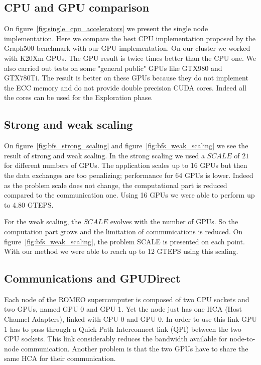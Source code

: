 \subsection{CPU and GPU comparison}

On figure~\ref{fig:single_cpu_accelerators} we present the single node implementation. 
Here we compare the best CPU implementation proposed by the Graph500 benchmark with our GPU implementation. 
On our cluster we worked with K20Xm GPUs. 
The GPU result is twice times better than the CPU one. 
We also carried out tests on some "general public" GPUs like GTX980 and GTX780Ti. 
The result is better on these GPUs because they do not implement the ECC memory and do not provide double precision CUDA cores. 
Indeed all the cores can be used for the Exploration phase. 



\subsection{Strong and weak scaling}

On figure~\ref{fig:bfs_strong_scaling} and figure~\ref{fig:bfs_weak_scaling} we see the result of strong and weak scaling. 
In the strong scaling we used a $SCALE$ of $21$ for different numbers of GPUs. 
The application scales up to 16 GPUs but then the data exchanges are too penalizing;
performance for 64 GPUs is lower. 
Indeed as the problem scale does not change, the computational part is reduced compared to the communication one. 
Using 16 GPUs we were able to perform up to 4.80 GTEPS. 


For the weak scaling, the $SCALE$ evolves with the number of GPUs. 
So the computation part grows and the limitation of communications is reduced. 
On figure~\ref{fig:bfs_weak_scaling}, the problem SCALE is presented on each point. 
With our method we were able to reach up to 12 GTEPS using this scaling. 


\subsection{Communications and GPUDirect}

Each node of the ROMEO supercomputer is composed of two CPU sockets and two GPUs, named GPU 0 and GPU 1.
Yet the node just has one HCA (Host Channel Adapters), linked with CPU 0 and GPU 0. 
In order to use this link GPU 1 has to pass through a Quick Path Interconnect link (QPI) between the two CPU sockets. 
This link considerably reduces the bandwidth available for node-to-node communication. 
Another problem is that the two GPUs have to share the same HCA for their communication. 



